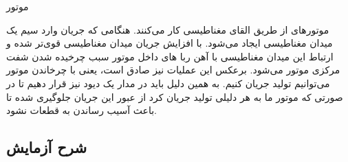 \newline
\begin{nas}موتور \end{nas}
\newline
موتورهای  از طریق القای مغناطیسی کار می‌کنند. هنگامی که جریان وارد سیم یک میدان مغناطیسی ایجاد می‌شود. با افزایش جریان میدان مغناطیسی قوی‌تر شده و ارتباط این میدان مغناطیسی با آهن ربا های داخل موتور سبب چرخیده شدن شفت مرکزی موتور می‌شود. برعکس این عملیات نیز صادق است، یعنی با چرخاندن موتور می‌توانیم تولید جریان کنیم. به همین دلیل باید در مدار یک دیود نیز قرار دهیم تا در صورتی که موتور ما به هر دلیلی تولید جریان کرد از عبور این جریان جلوگیری شده تا باعث آسیب رساندن به قطعات نشود.

\subsection{شرح آزمایش}
